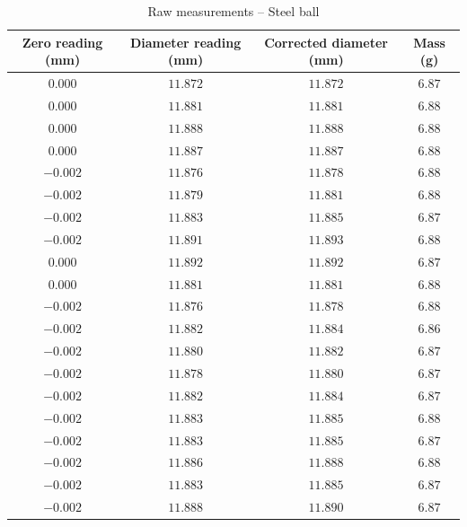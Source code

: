 \begin{table}[htb!]
\centering
\caption{Raw measurements -- Steel ball}
\begin{tabular}{cccc}
\toprule
Zero reading (\unit{\mm}) & Diameter reading (\unit{\mm}) & Corrected diameter (\unit{\mm}) & Mass (\unit{\g}) \\
\midrule
$0.000$ & $11.872$ & $11.872$ & $6.87$ \\
$0.000$ & $11.881$ & $11.881$ & $6.88$ \\
$0.000$ & $11.888$ & $11.888$ & $6.88$ \\
$0.000$ & $11.887$ & $11.887$ & $6.88$ \\
$-0.002$ & $11.876$ & $11.878$ & $6.88$ \\
$-0.002$ & $11.879$ & $11.881$ & $6.88$ \\
$-0.002$ & $11.883$ & $11.885$ & $6.87$ \\
$-0.002$ & $11.891$ & $11.893$ & $6.88$ \\
$0.000$ & $11.892$ & $11.892$ & $6.87$ \\
$0.000$ & $11.881$ & $11.881$ & $6.88$ \\
$-0.002$ & $11.876$ & $11.878$ & $6.88$ \\
$-0.002$ & $11.882$ & $11.884$ & $6.86$ \\
$-0.002$ & $11.880$ & $11.882$ & $6.87$ \\
$-0.002$ & $11.878$ & $11.880$ & $6.87$ \\
$-0.002$ & $11.882$ & $11.884$ & $6.87$ \\
$-0.002$ & $11.883$ & $11.885$ & $6.88$ \\
$-0.002$ & $11.883$ & $11.885$ & $6.87$ \\
$-0.002$ & $11.886$ & $11.888$ & $6.88$ \\
$-0.002$ & $11.883$ & $11.885$ & $6.87$ \\
$-0.002$ & $11.888$ & $11.890$ & $6.87$ \\
\bottomrule
\end{tabular}
\end{table}
